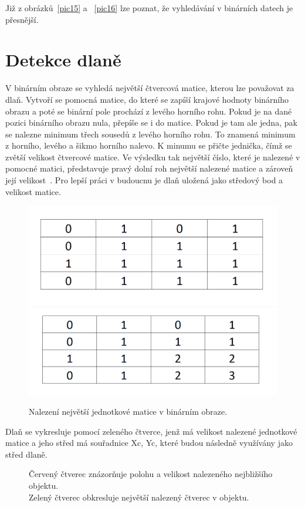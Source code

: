 Již z obrázků~\ref{pic15} a ~\ref{pic16} lze poznat, že vyhledávání v binárních datech je přesnější.
\newpage
\section{Detekce dlaně}
V binárním obraze se vyhledá největší čtvercová matice, kterou lze považovat za dlaň. Vytvoří se pomocná matice, do které se zapíší krajové hodnoty binárního obrazu a poté se binární pole prochází z levého horního rohu. Pokud je na dané pozici binárního obrazu nula, přepíše se i do matice. Pokud je tam ale jedna, pak se nalezne minimum třech sousedů z levého horního rohu. To znamená minimum z horního, levého a šikmo horního nalevo. K minumu se přičte jednička, čímž se zvětší velikost čtvercové matice. Ve výsledku tak největší číslo, které je nalezené v pomocné matici, představuje pravý dolní roh největší nalezené matice a zároveň její velikost~\cite{23}. Pro lepší práci v budoucnu je dlaň uložená jako středový bod a velikost matice.

\begin{figure} [htp]
\centering
\includegraphics[width=.45\textwidth]{before.png} \hfill
\includegraphics[width=.45\textwidth]{after.png} 
\centering
\caption{Nalezení největší jednotkové matice v binárním obraze.}
\label{pic17}
\end{figure}

Dlaň se vykresluje pomocí zeleného čtverce, jenž má velikost nalezené jednotkové matice a jeho střed má souřadnice Xc, Yc, které budou následně využívány jako střed dlaně.

\begin{figure}[htp]
\centering
{}
\caption{Červený čtverec znázorňuje polohu a velikost nalezeného nejbližšího objektu.\\
Zelený čtverec obkresluje největší nalezený čtverec v objektu.}
\label{pic18}
\end{figure}

